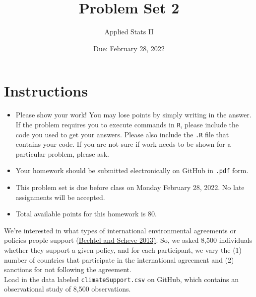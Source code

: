 \documentclass[12pt,letterpaper]{article}
\title{Problem Set 2}
\date{Due: February 28, 2022}
\author{Applied Stats II}
\begin{document}
	\maketitle
	\section*{Instructions}
	\begin{itemize}
		\item Please show your work! You may lose points by simply writing in the answer. If the problem requires you to execute commands in \texttt{R}, please include the code you used to get your answers. Please also include the \texttt{.R} file that contains your code. If you are not sure if work needs to be shown for a particular problem, please ask.
		\item Your homework should be submitted electronically on GitHub in \texttt{.pdf} form.
		\item This problem set is due before class on Monday February 28, 2022. No late assignments will be accepted.
		\item Total available points for this homework is 80.
	\end{itemize}

	
	

	\vspace{.25cm}
\noindent We're interested in what types of international environmental agreements or policies people support (\href{https://www.pnas.org/content/110/34/13763}{Bechtel and Scheve 2013)}. So, we asked 8,500 individuals whether they support a given policy, and for each participant, we vary the (1) number of countries that participate in the international agreement and (2) sanctions for not following the agreement. \\

\noindent Load in the data labeled \texttt{climateSupport.csv} on GitHub, which contains an observational study of 8,500 observations.
\end{document}
